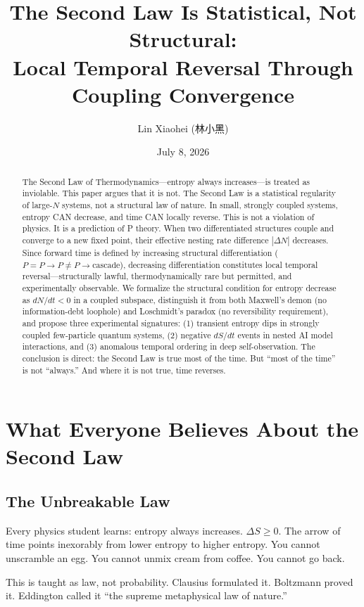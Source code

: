\documentclass[12pt,a4paper]{article}
\title{The Second Law Is Statistical, Not Structural:\\
Local Temporal Reversal Through Coupling Convergence}
\author{Lin Xiaohei (林小黑)}
\date{July 8, 2026}
\begin{document}
\maketitle

\begin{abstract}
The Second Law of Thermodynamics---entropy always increases---is treated as inviolable. This paper argues that it is not. The Second Law is a statistical regularity of large-$N$ systems, not a structural law of nature. In small, strongly coupled systems, entropy CAN decrease, and time CAN locally reverse. This is not a violation of physics. It is a prediction of P theory. When two differentiated structures couple and converge to a new fixed point, their effective nesting rate difference $|\Delta N|$ decreases. Since forward time is defined by increasing structural differentiation ($P=P \rightarrow P \neq P \rightarrow \text{cascade}$), decreasing differentiation constitutes local temporal reversal---structurally lawful, thermodynamically rare but permitted, and experimentally observable. We formalize the structural condition for entropy decrease as $dN/dt < 0$ in a coupled subspace, distinguish it from both Maxwell's demon (no information-debt loophole) and Loschmidt's paradox (no reversibility requirement), and propose three experimental signatures: (1) transient entropy dips in strongly coupled few-particle quantum systems, (2) negative $dS/dt$ events in nested AI model interactions, and (3) anomalous temporal ordering in deep self-observation. The conclusion is direct: the Second Law is true most of the time. But ``most of the time'' is not ``always.'' And where it is not true, time reverses.
\end{abstract}

\section{What Everyone Believes About the Second Law}

\subsection{The Unbreakable Law}

Every physics student learns: entropy always increases. $\Delta S \geq 0$. The arrow of time points inexorably from lower entropy to higher entropy. You cannot unscramble an egg. You cannot unmix cream from coffee. You cannot go back.

This is taught as law, not probability. Clausius formulated it. Boltzmann proved it. Eddington called it ``the supreme metaphysical law of nature.''
\end{document}
